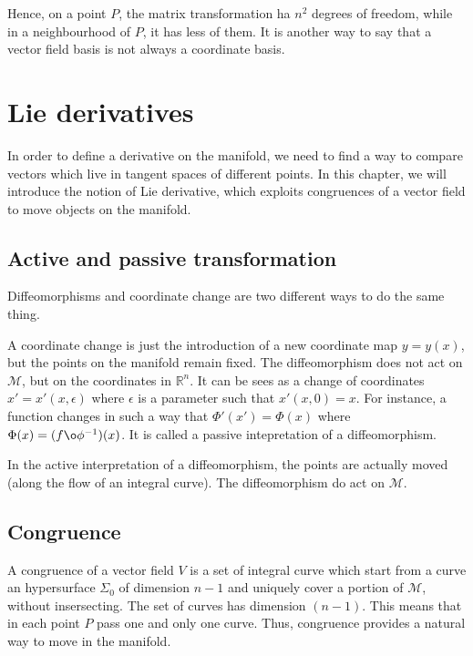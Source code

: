     Hence, on a point $P$, the matrix transformation ha $n^2$ degrees of freedom, while in a neighbourhood of $P$, it has less of them. It is another way to say that a vector field basis is not always a coordinate basis.

\chapter{Lie derivatives}

    In order to define a derivative on the manifold, we need to find a way to compare vectors which live in tangent spaces of different points. In this chapter, we will introduce the notion of Lie derivative, which exploits congruences of a vector field to move objects on the manifold.

\section{Active and passive transformation}

    Diffeomorphisms and coordinate change are two different ways to do the same thing. 
    
    A coordinate change is just the introduction of a new coordinate map $y = y(x)$, but the points on the manifold remain fixed. The diffeomorphism does not act on $\mathcal M$, but on the coordinates in $\mathbb R^n$. It can be sees as a change of coordinates $x' = x'(x, \epsilon)$ where $\epsilon$ is a parameter such that $x'(x, 0) = x$. For instance, a function changes in such a way that $\Phi'(x') = \Phi(x)$ where $\Phi(x) = (f \o \phi^{-1})(x)$. It is called a passive intepretation of a diffeomorphism.

    In the active interpretation of a diffeomorphism, the points are actually moved (along the flow of an integral curve). The diffeomorphism do act on $\mathcal M$. 

\section{Congruence}

    A congruence of a vector field $V$ is a set of integral curve which start from a curve an hypersurface $\Sigma_0$ of dimension $n-1$ and uniquely cover a portion of $\mathcal M$, without insersecting. The set of curves has dimension $(n-1)$. This means that in each point $P$ pass one and only one curve. Thus, congruence provides a natural way to move in the manifold. 
    
